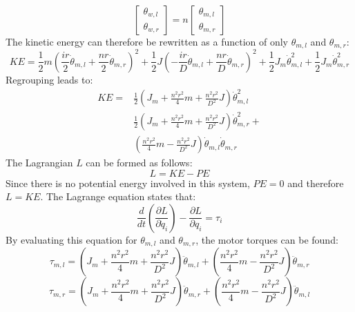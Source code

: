 \documentclass[a4paper, 11pt]{article}
\begin{document}
\begin{equation}
\begin{bmatrix}
\theta_{w,l} \\ \theta_{w,r}
\end{bmatrix}
= n
\begin{bmatrix}
\theta_{m,l} \\ \theta_{m,r}
\end{bmatrix}
\label{eq:gearRatio}
\end{equation}
The kinetic energy can therefore be rewritten as a function of only $\theta_{m,l}$ and $\theta_{m,r}$:
\begin{equation}
	KE = \frac{1}{2}m\left(   \frac{ir}{2}\dot{\theta}_{m,l} + \frac{nr}{2}\dot{\theta}_{m,r}  \right)^2 +
	\frac{1}{2}J\left(   -\frac{ir}{D}\dot{\theta}_{m,l} + \frac{nr}{D}\dot{\theta}_{m,r}  \right)^2 + 	
	\frac{1}{2}J_m\dot{\theta}_{m,l}^2 + \frac{1}{2}J_m\dot{\theta}_{m,r}^2
\end{equation}
Regrouping leads to:
\begin{equation}
\begin{split}
	KE = &\frac{1}{2}\left(  J_m + \frac{n^2r^2}{4}m + \frac{n^2r^2}{D^2}J \right) \dot{\theta}_{m,l}^2 \\[8pt]
	&\frac{1}{2}\left(  J_m + \frac{n^2r^2}{4}m + \frac{n^2r^2}{D^2}J \right) \dot{\theta}_{m,r}^2 + \\[8pt]
	&\left( \frac{n^2r^2}{4}m - \frac{n^2r^2}{D^2}J   \right)\dot{\theta}_{m,l}\dot{\theta}_{m,r}
\end{split}
\end{equation}
The Lagrangian $L$ can be formed as follows:
\begin{equation}
	L = KE - PE
\end{equation}
Since there is no potential energy involved in this system, $PE = 0$ and therefore $L = KE$. The Lagrange equation states that:
\begin{equation}
	\frac{d}{dt}\left(  \frac{\partial L}{\partial \dot{q}_i} \right) - \frac{\partial L}{\partial q_i} = \tau_i
\end{equation} 
By evaluating this equation for $\theta_{m,l}$ and $\theta_{m,r}$, the motor torques can be found:
\begin{equation}
	\tau_{m,l} = \left(  J_m + \frac{n^2r^2}{4}m + \frac{n^2r^2}{D^2}J \right) \ddot{\theta}_{m,l} + \left( \frac{n^2r^2}{4}m - \frac{n^2r^2}{D^2}J   \right)\ddot{\theta}_{m,r}
\end{equation}
\begin{equation}
\tau_{m,r} = \left(  J_m + \frac{n^2r^2}{4}m + \frac{n^2r^2}{D^2}J \right) \ddot{\theta}_{m,r} + \left( \frac{n^2r^2}{4}m - \frac{n^2r^2}{D^2}J   \right)\ddot{\theta}_{m,l}
\end{equation}
\end{document}
